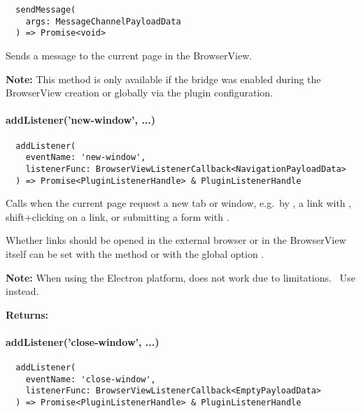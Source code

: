 \begin{verbatim}
  sendMessage(
    args: MessageChannelPayloadData
  ) => Promise<void>
\end{verbatim}

Sends a message to the current page in the BrowserView.

\textbf{Note:} This method is only available if the bridge was enabled during the BrowserView creation or globally via the plugin configuration.


\paragraph{addListener('new-window', ...)}

\begin{verbatim}
  addListener(
    eventName: 'new-window',
    listenerFunc: BrowserViewListenerCallback<NavigationPayloadData>
  ) => Promise<PluginListenerHandle> & PluginListenerHandle
\end{verbatim}

Calls  when the current page request a new tab or window, e.g.\ by ,
a link with , shift+clicking on a link, or submitting a form with .

Whether links should be opened in the external browser or in the BrowserView itself can be set with
the method  or with the global option .

\textbf{Note:} When using the Electron platform,  does not work due to limitations.~\cite{capacitor-electron}
Use  instead.

\textbf{Returns:} 


\paragraph{addListener('close-window', ...)}

\begin{verbatim}
  addListener(
    eventName: 'close-window',
    listenerFunc: BrowserViewListenerCallback<EmptyPayloadData>
  ) => Promise<PluginListenerHandle> & PluginListenerHandle
\end{verbatim}

